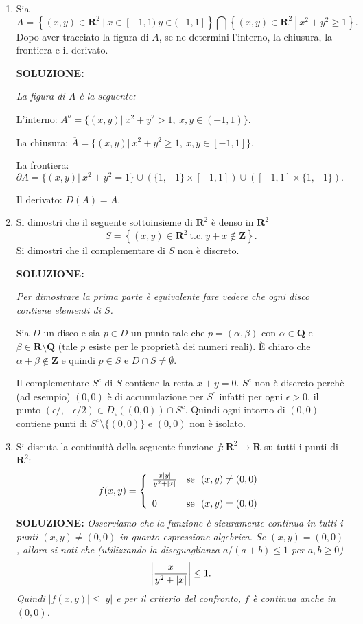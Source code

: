 \documentclass[12pt,a4paper]{report}\pagenumbering{roman}
\begin{document}
\begin{enumerate}
\item Sia 
$$A=\left\{(x,y)\in{\mathbf R}^2\ \left|\ x\in[-1,1)\ y\in(-1,1]\right.\right\}\bigcap
\left\{(x,y)\in{\mathbf R}^2\ \left|\ x^2+y^2\geq1\right.\right\}.$$ 
Dopo aver tracciato la figura di $A$, se ne determini
l'interno, la chiusura, la frontiera e il derivato.

{\bf SOLUZIONE:} {\it La figura di $A$ \`e la seguente:


L'interno: $A^o=\{(x,y)|\ x^2+y^2>1,\ x,y\in(-1,1)\}.$

La chiusura: $\overline{A}=\{(x,y)|\ x^2+y^2\geq1,\ x,y\in[-1,1]\}.$

La frontiera: $\partial{A}=\{(x,y)|\ x^2+y^2=1\}\cup \left(\{1,-1\}\times [-1,1]\right)\cup
\left([-1,1]\times\{1,-1\}\right).$

Il derivato: $D(A)=A$.}

\item Si dimostri che il seguente sottoinsieme di ${\mathbf R}^2$ \`e denso in ${\mathbf R}^2$
$$S=\left\{(x,y)\in{\mathbf R}^2\ \mbox{t.c.}\ y+x\not\in{\mathbf Z}\right\}.$$
Si dimostri che il complementare di $S$ non \`e discreto.

{\bf SOLUZIONE:} {\it Per dimostrare la prima parte \`e equivalente fare vedere che
ogni disco contiene elementi di $S$.

Sia $D$ un disco e sia $p\in D$ un punto tale che $p=(\alpha,\beta)$ con $\alpha\in\mathbf Q$ e
$\beta\in\mathbf R\setminus\mathbf Q$ (tale $p$ esiste per le propriet\`a dei numeri
reali). \`E chiaro che $\alpha+\beta\not\in\mathbf Z$ e quindi $p\in S$ e $D\cap S\neq\emptyset$.

Il complementare $S^c$ di $S$ contiene la retta $x+y=0$. $S^c$ non \`e discreto
perch\`e (ad esempio) $(0,0)$ \`e di accumulazione per $S^c$ infatti per ogni
$\epsilon>0$, il punto $(\epsilon/,-\epsilon/2)\in D_\epsilon((0,0))\cap S^c$. Quindi
ogni intorno di $(0,0)$ contiene punti di $S^c\setminus\{(0,0)\}$ e $(0,0)$ non \`e
isolato.}

\item Si discuta la continuit\`a della seguente funzione $f:{\mathbf R}^2\longrightarrow
{\mathbf R}$ su tutti i punti di ${\mathbf R}^2$:
$$f(x,y)=\left\{\begin{array}{ll} {x|y|\over y^2+|x|} & 
\mbox{se}\ \ (x,y)\neq (0,0)\\ \\0&\mbox{se}\ \ (x,y)=(0,0)\end{array}\right.$$
{\bf SOLUZIONE:} {\it Osserviamo che la funzione \`e sicuramente continua in tutti i punti $(x,y)\neq(0,0)$
in quanto espressione algebrica. Se $(x,y)=(0,0)$, allora si noti che (utilizzando la diseguaglianza
$a/(a+b)\leq1$ per $a,b\geq0$)
$$\left|{x\over y^2+|x|}\right|\leq 1.$$ 
Quindi $|f(x,y)|\leq |y|$ e per il criterio del confronto, $f$ \`e continua anche in $(0,0)$.}


\end{enumerate}
\end{document}
